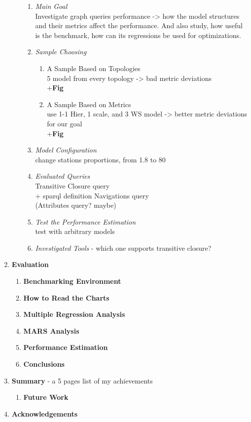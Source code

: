 \begin{enumerate}
\begin{enumerate}[label*=\arabic*.]
				\begin{enumerate}[label*=\arabic*.]
					\item \textit{Main Goal}\\
						Investigate graph queries performance -> how the model structures and their metrics affect the performance. And also study, how useful is the benchmark, how can its regressions be used for optimizations.
					\item \textit{Sample Choosing}
							\begin{enumerate}[label*=\arabic*.]
								\item A Sample Based on Topologies\\ 5 model from every topology -> bad metric deviations\\ +\textbf{Fig}
								\item A Sample Based on Metrics\\
									use 1-1 Hier, 1 scale, and 3 WS model -> better metric deviations for our goal \\+\textbf{Fig}
							\end{enumerate}
					
					\item \textit{Model Configuration}\\
							change stations proportions, from 1.8 to 80%
					\item \textit{Evaluated Queries}\\
							Transitive Closure query\\
								+ sparql definition
							Navigations query\\
							(Attributes query? maybe)
					\item \textit{Test the Performance Estimation}\\
						test with arbitrary models
					\item \textit{Investigated Tools} - which one supports transitive closure?
				\end{enumerate}
		\end{enumerate}
		
		
	\item \textbf{Evaluation}
			\begin{enumerate}[label*=\arabic*.]
				\item \textbf{Benchmarking Environment}
				\item \textbf{How to Read the Charts}
				\item \textbf{Multiple Regression Analysis}
				\item \textbf{MARS Analysis}
				\item \textbf{Performance Estimation}
				\item \textbf{Conclusions}
			\end{enumerate}
	\item \textbf{Summary} - a 5 pages list of my achievements
		\begin{enumerate}[label*=\arabic*.]
			\item \textbf{Future Work}
		\end{enumerate}
	\item \textbf{Acknowledgements}
\end{enumerate}


